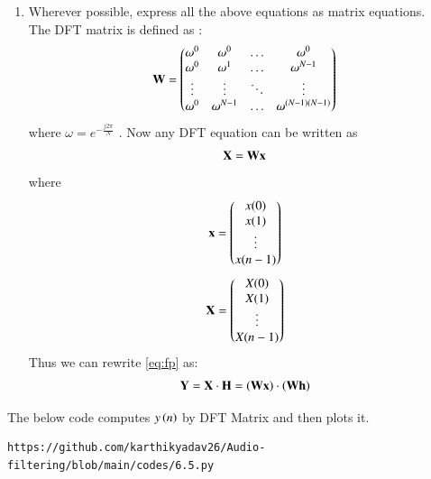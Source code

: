 \documentclass[journal,12pt,twocolumn]{IEEEtran}
\theoremstyle{remark}
\renewcommand\thesection{\arabic{section}}
\begin{document}
\begin{enumerate}[label=\thesection.\arabic*]
\item Wherever possible, express all the above equations as matrix equations.\\
\solution The DFT matrix is defined as : 
\begin{align}
	\mathbf{W} = 
	\begin{pmatrix}
		\omega^0 & \omega^0 & \ldots & \omega^0 \\
		\omega^0 & \omega^1 & \ldots & \omega^{N - 1} \\
		\vdots & \vdots & \ddots & \vdots \\
		\omega^0 & \omega^{N - 1} & \ldots & \omega^{(N -1)(N - 1)}
	\end{pmatrix}
\end{align}
where $\omega=e^{-\frac{j2\pi}{N}}$ . Now any DFT equation can be written as
\begin{align}
    \mathbf{X} = \mathbf{W}\mathbf{x}
\end{align}
\noindent where
\begin{align}
	\mathbf{x} = 
	\begin{pmatrix}
		x(0) \\ x(1) \\ \vdots \\ x(n - 1)
	\end{pmatrix}
\end{align}
\begin{align}
	\mathbf{X} = 
	\begin{pmatrix}
		X(0) \\ X(1) \\ \vdots \\ X(n - 1)
	\end{pmatrix}
\end{align}
Thus we can rewrite  \eqref{eq:fp} as:
\begin{align}
	\mathbf{Y} = \mathbf{X}\cdot\mathbf{H} = \left(\mathbf{W}\mathbf{x}\right)\cdot\left(\mathbf{W}\mathbf{h}\right)
\end{align}
\end{enumerate}
The below code computes $y\left(n\right)$ by DFT Matrix and then plots it.
\begin{lstlisting}
https://github.com/karthikyadav26/Audio-filtering/blob/main/codes/6.5.py
\end{lstlisting}
\end{document}
